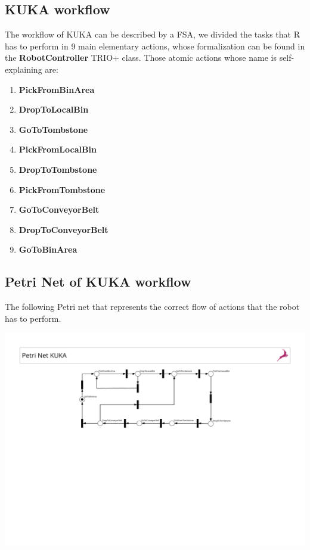 \documentclass[a4paper]{article}
\begin{document}
\subsection{KUKA workflow}
The workflow of KUKA can be described by a FSA, we divided the tasks that R has to perform in 9 main elementary actions, whose formalization can be found in the \textbf{RobotController} TRIO+ class.
Those atomic actions whose name is self-explaining are:

\begin{enumerate}
    \item \textbf{PickFromBinArea}\@ 
    \item \textbf{DropToLocalBin}\@
    \item \textbf{GoToTombstone}\@ 
    \item \textbf{PickFromLocalBin}\@ 
    \item \textbf{DropToTombstone}\@ 
    \item \textbf{PickFromTombstone}\@ 
    \item \textbf{GoToConveyorBelt}\@ 
    \item \textbf{DropToConveyorBelt}\@ 
    \item \textbf{GoToBinArea}\@ 
\end{enumerate}
\clearpage
\subsection{Petri Net of KUKA workflow}
The following Petri net that represents the correct flow of actions that the robot has to perform.
\begin{center}
    \includegraphics[width=18cm]{images/petriNetKuka}
\end{center}
\end{document}
